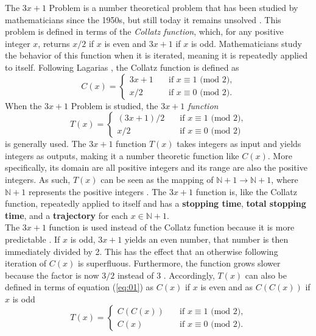 \documentclass[12pt,a4paper,reqno]{amsart}
\begin{document}
The $3x+1$ Problem is a number theoretical problem that has been studied by 
mathematicians since the 1950s, but still today it remains unsolved 
\cite{src:lagarias}. This problem is defined in terms of the \textit{Collatz 
function}, which, for any positive integer $x$, returns $x/2$ if $x$ is even 
and $3x+1$ if $x$ is odd. Mathematicians study the behavior of this function 
when it is iterated, meaning it is repeatedly applied to itself. Following 
Lagarias \cite{src:lagarias}, the Collatz function is defined as 
\begin{equation}
C(x)= \left\{
    \begin{array}{ll}
        3x+1 \quad &\text{if } x \equiv 1 \text{ (mod 2),} \\
        x/2 \quad &\text{if } x \equiv 0 \text{ (mod 2).}
    \end{array}
\right.
\label{eq:01}
\end{equation}
When the $3x+1$ Problem is studied, the \textit{$3x+1$ function} 
\begin{equation}
T(x)= \left\{
    \begin{array}{ll}
        (3x+1)/2 \quad &\text{if } x \equiv 1 \text{ (mod 2),} \\
        x/2 \quad &\text{if } x \equiv 0 \text{ (mod 2)}
    \end{array}
\right.
\label{eq:02}
\end{equation}
is generally used. The $3x+1$ function $T(x)$ takes integers as input and 
yields integers as outputs, making it a number theoretic function like $C(x)$. 
More specifically, its domain are all positive integers and its range are also 
the positive integers. As such, $T(x)$ can be seen as the mapping of 
$\mathbb{N} + 1 \rightarrow \mathbb{N} + 1$, where $\mathbb{N} + 1$ represents
the positive integers \cite{src:tao}. The $3x+1$  function is, like the Collatz 
function, repeatedly applied to itself and has a \textbf{stopping time}, 
\textbf{total stopping time}, and a \textbf{trajectory} for each 
$x \in \mathbb{N} + 1$. \\
The $3x+1$ function is used instead of the Collatz function because it is more 
predictable \cite{src:lagarias}. If $x$ is odd, $3x+1$ yields an even number, 
that number is then immediately divided by 2. This has the effect that an 
otherwise following iteration of $C(x)$ is superfluous. Furthermore, the 
function grows slower because the factor is now $3/2$ instead of 3 
\cite{src:lagarias}. Accordingly, $T(x)$ can also be defined in terms of 
equation (\ref{eq:01}) as $C(x)$ if $x$ is even and as $C(C(x))$ if $x$ is odd
\begin{equation}
T(x)= \left\{
\nonumber
    \begin{array}{ll}
        C(C(x))\quad &\text{if } x \equiv 1 \text{ (mod 2),} \\
        C(x) \quad &\text{if } x \equiv 0 \text{ (mod 2).}
    \end{array}
\right.
\label{eq:03}
\end{equation}
\end{document}
